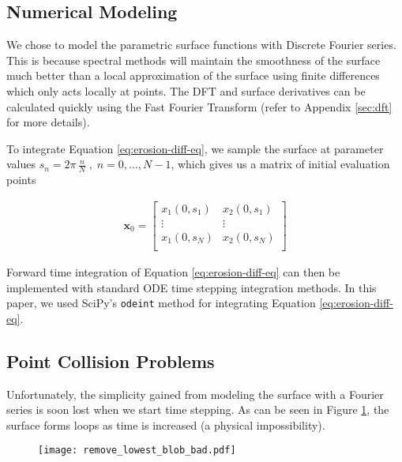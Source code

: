 \subsection*{Numerical Modeling}\label{sec:numerical-modeling}

We chose to model the parametric surface functions with Discrete Fourier series. This is because spectral methods will maintain the smoothness of the surface much better than a local approximation of the surface using finite differences which only acts locally at points. The DFT and surface derivatives can be calculated quickly using the Fast Fourier Transform (refer to Appendix \ref{sec:dft} for more details).

To integrate Equation \ref{eq:erosion-diff-eq}, we sample the surface at parameter values $s_n = 2 \pi \, \frac{n}{N} \; , \; n = 0, \dotsc, N-1$, which gives us a matrix of initial evaluation points

\begin{align*} 
  \boldsymbol{x}_0 = \begin{bmatrix}
    x_1(0, s_1)& x_2(0, s_1)\\
    \vdots& \vdots\\
    x_1(0, s_N)& x_2(0, s_N)\\ 
  \end{bmatrix}
\end{align*}

Forward time integration of Equation \ref{eq:erosion-diff-eq} can then be implemented with standard ODE time stepping integration methods. In this paper, we used SciPy's {\tt odeint} method for integrating Equation \ref{eq:erosion-diff-eq}.

\subsection*{Point Collision Problems}

Unfortunately, the simplicity gained from modeling the surface with a Fourier series is soon lost when we start time stepping. As can be seen in Figure \ref{fig:remove-lowest-blob-bad}, the surface forms loops as time is increased (a physical impossibility).

\begin{figure}[H]
    \begin{center}
      \texttt{[image: remove\_lowest\_blob\_bad.pdf]}
    \end{center}
  \vspace{-.2in} %
  \caption{\label{fig:remove-lowest-blob-bad}}
\end{figure}

